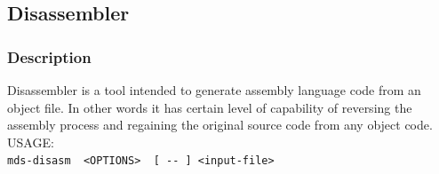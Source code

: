             
    \subsection{Disassembler}
        \subsubsection{Description}
            Disassembler is a tool intended to generate assembly language code from an object file. In other words it has certain level of
            capability of reversing the assembly process and regaining the original source code from any object code.\\

            USAGE:
            {
                ~\\
                \usecodefont
                \verb'mds-disasm  <OPTIONS>  [ -- ] <input-file>'\\
            }
